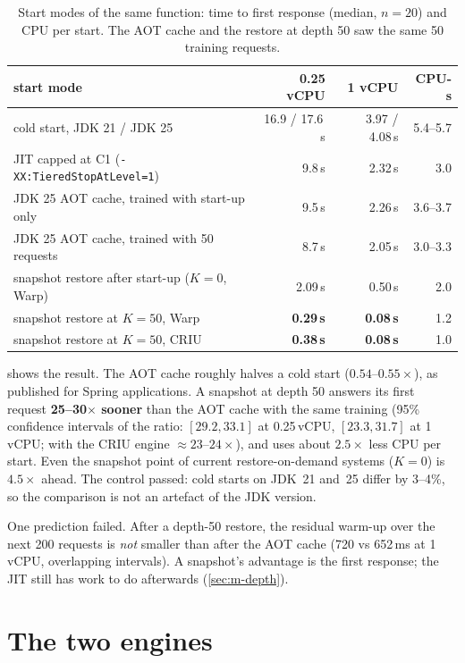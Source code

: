 \begin{table}[htbp]
\centering
\caption{Start modes of the same function: time to first response (median, $n = 20$) and CPU per
start. The AOT cache and the restore at depth 50 saw the same 50 training requests.}
\label{tab:m-aot}
\small
\begin{tabular}{@{}lrrr@{}}
\toprule
start mode & 0.25 vCPU & 1 vCPU & CPU-s \\
\midrule
cold start, JDK 21 / JDK 25 & 16.9 / 17.6\,s & 3.97 / 4.08\,s & 5.4--5.7 \\
JIT capped at C1 (\texttt{-XX:TieredStopAtLevel=1}) & 9.8\,s & 2.32\,s & 3.0 \\
JDK 25 AOT cache, trained with start-up only & 9.5\,s & 2.26\,s & 3.6--3.7 \\
JDK 25 AOT cache, trained with 50 requests & 8.7\,s & 2.05\,s & 3.0--3.3 \\
snapshot restore after start-up ($K = 0$, Warp) & 2.09\,s & 0.50\,s & 2.0 \\
snapshot restore at $K = 50$, Warp & \textbf{0.29\,s} & \textbf{0.08\,s} & 1.2 \\
snapshot restore at $K = 50$, CRIU & \textbf{0.38\,s} & \textbf{0.08\,s} & 1.0 \\
\bottomrule
\end{tabular}
\end{table}

 shows the result. The AOT cache roughly halves a cold start ($0.54$--$0.55\times$),
as published for Spring applications. A snapshot at depth 50 answers its first request
\textbf{25--30$\times$ sooner} than the AOT cache with the same training (95\% confidence
intervals of the ratio: $[29.2, 33.1]$ at 0.25\,vCPU, $[23.3, 31.7]$ at 1\,vCPU; with the CRIU engine
$\approx 23$--$24\times$), and uses about $2.5\times$ less CPU per start. Even the snapshot point
of current restore-on-demand systems ($K = 0$) is $4.5\times$ ahead. The control passed: cold
starts on JDK~21 and~25 differ by 3--4\%, so the comparison is not an artefact of the JDK version.

One prediction failed. After a depth-50 restore, the residual warm-up over the next 200 requests
is \emph{not} smaller than after the AOT cache (720 vs 652\,ms at 1\,vCPU, overlapping intervals).
A snapshot's advantage is the first response; the JIT still has work to do afterwards
(\cref{sec:m-depth}).

\section{The two engines}
\label{sec:m-engines}


